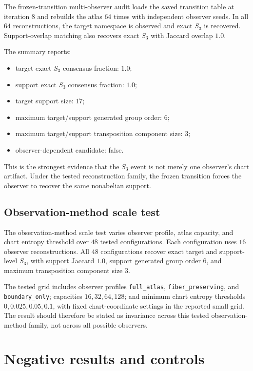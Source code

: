 \documentclass[11pt]{article}
\begin{document}
The frozen-transition multi-observer audit loads the saved transition table at iteration $8$ and rebuilds the atlas $64$ times with independent observer seeds.  In all $64$ reconstructions, the target namespace is observed and exact $S_3$ is recovered.  Support-overlap matching also recovers exact $S_3$ with Jaccard overlap $1.0$.

The summary reports:
\begin{itemize}
\item target exact $S_3$ consensus fraction: $1.0$;
\item support exact $S_3$ consensus fraction: $1.0$;
\item target support size: $17$;
\item maximum target/support generated group order: $6$;
\item maximum target/support transposition component size: $3$;
\item observer-dependent candidate: false.
\end{itemize}

This is the strongest evidence that the $S_3$ event is not merely one observer's chart artifact.  Under the tested reconstruction family, the frozen transition forces the observer to recover the same nonabelian support.

\subsection{Observation-method scale test}

The observation-method scale test varies observer profile, atlas capacity, and chart entropy threshold over $48$ tested configurations.  Each configuration uses $16$ observer reconstructions.  All $48$ configurations recover exact target and support-level $S_3$, with support Jaccard $1.0$, support generated group order $6$, and maximum transposition component size $3$.

The tested grid includes observer profiles \texttt{full\_atlas}, \texttt{fiber\_preserving}, and \texttt{boundary\_only}; capacities $16,32,64,128$; and minimum chart entropy thresholds $0,0.025,0.05,0.1$, with fixed chart-coordinate settings in the reported small grid.  The result should therefore be stated as invariance across this tested observation-method family, not across all possible observers.

\section{Negative results and controls}
\end{document}
